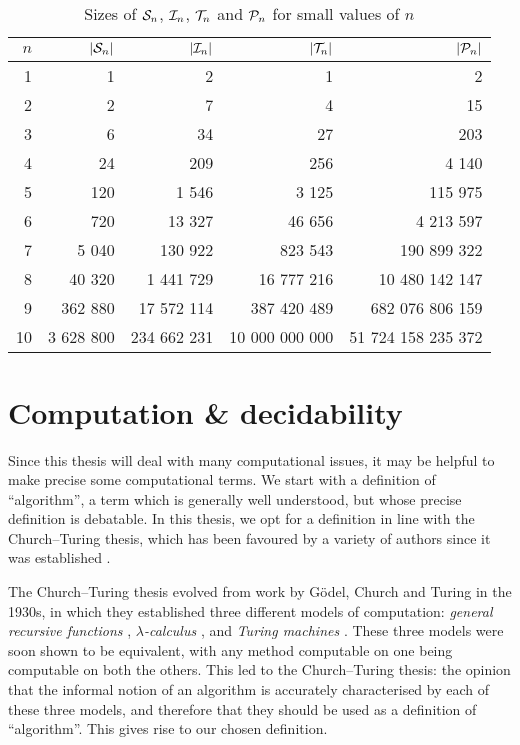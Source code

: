 \begin{table}[h]
  \centering
  \renewcommand\arraystretch{1.0}
  \begin{tabular}{| r | r | r | r | r |}
    \hline
    $n$ & $|\mathcal{S}_n|$ & $|\mathcal{I}_n|$ & $|\mathcal{T}_n|$ & $|\mathcal{P}_n|$ \\
    \hline
     1 &         1&           2&              1&                  2 \\
     2 &         2&           7&              4&                 15 \\
     3 &         6&          34&             27&                203 \\
     4 &        24&         209&            256&              4 140 \\
     5 &       120&       1 546&          3 125&            115 975 \\
     6 &       720&      13 327&         46 656&          4 213 597 \\
     7 &     5 040&     130 922&        823 543&        190 899 322 \\
     8 &    40 320&   1 441 729&     16 777 216&     10 480 142 147 \\
     9 &   362 880&  17 572 114&    387 420 489&    682 076 806 159 \\
    10 & 3 628 800& 234 662 231& 10 000 000 000& 51 724 158 235 372 \\
    \hline
  \end{tabular}
  \renewcommand\arraystretch{0.7}
  \caption{Sizes of $\mathcal{S}_n$, $\mathcal{I}_n$, $\mathcal{T}_n$ and $\mathcal{P}_n$ for small values of
    $n$}
  \label{tab:pn-size}
\end{table}

\section{Computation \& decidability}
\label{sec:computation-decidability}

Since this thesis will deal with many computational issues, it may be helpful to
make precise some computational terms.  We start with a definition of
``algorithm'', a term which is generally well understood, but whose precise
definition is debatable.  In this thesis, we opt for a definition in line with
the Church--Turing thesis, which has been favoured by a variety of authors since
it was established \cite{gurevich_2000, minsky_1967}.

The Church--Turing thesis evolved from work by G\"{o}del, Church and Turing in
the 1930s, in which they established three different models of computation:
\textit{general recursive functions} \cite{godel}, \textit{$\lambda$-calculus}
\cite{church}, and \textit{Turing machines} \cite{turing}.  These three models
were soon shown to be equivalent, with any method computable on one being
computable on both the others.  This led to the Church--Turing thesis: the
opinion that the informal notion of an algorithm is accurately characterised by
each of these three models, and therefore that they should be used as a
definition of ``algorithm''.  This gives rise to our chosen definition.

